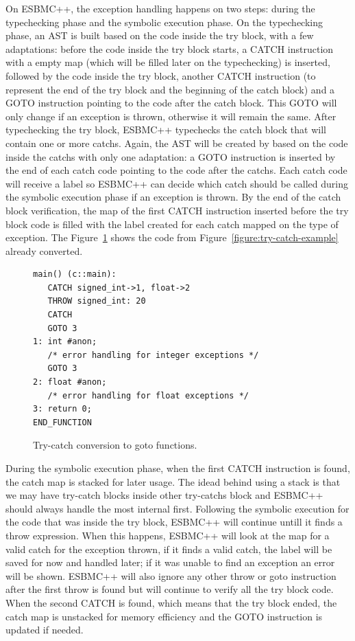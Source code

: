 \documentclass[a4paper]{llncs}
\begin{document}
On ESBMC++, the exception handling happens on two steps:
during the typechecking phase and the symbolic execution phase.
On the typechecking phase, an AST is built based on the code
inside the try block, with a few adaptations: before the code
inside the try block starts, a CATCH instruction with a empty map
(which will be filled later on the typechecking) is inserted, followed by
the code inside the try block, another CATCH instruction
(to represent the end of the try block and the beginning of the
catch block) and a GOTO instruction pointing to the code after
the catch block. This GOTO will only change if an exception is thrown,
otherwise it will remain the same. After typechecking the try block,
ESBMC++ typechecks the catch block that will contain one or more catchs.
Again, the AST will be created by based on the code inside the catchs
with only one adaptation: a GOTO instruction is inserted by the end of
each catch code pointing to the code after the catchs. Each catch code
will receive a label so ESBMC++ can decide which catch should be called
during the symbolic execution phase if an exception is thrown. By the end
of the catch block verification, the map of the first CATCH instruction
inserted before the try block code is filled with the label created
for each catch mapped on the type of exception. The Figure~\ref{figure:try-catch-goto}
shows the code from Figure~\ref{figure:try-catch-example} already converted.

\begin{figure}[ht]
\centering
\begin{minipage}{1.0\textwidth}
\begin{lstlisting}
main() (c::main):
   CATCH signed_int->1, float->2
   THROW signed_int: 20
   CATCH
   GOTO 3
1: int #anon;
   /* error handling for integer exceptions */
   GOTO 3
2: float #anon;
   /* error handling for float exceptions */
3: return 0;
END_FUNCTION
\end{lstlisting}
\end{minipage}
\caption{Try-catch conversion to goto functions.}
\label{figure:try-catch-goto}
\end{figure}

During the symbolic execution phase, when the first
CATCH instruction is found, the catch map is stacked
for later usage. The idead behind using a stack is
that we may have try-catch blocks inside other
try-catchs block and ESBMC++ should always handle
the most internal first. Following the symbolic execution
for the code that was inside the try block, ESBMC++ will continue
untill it finds a throw expression. When this happens, ESBMC++ will
look at the map for a valid catch for the exception thrown, if it finds
a valid catch, the label will be saved for now and handled later;
if it was unable to find an exception an error will be shown.
ESBMC++ will also ignore any other throw or goto instruction after
the first throw is found but will continue to verify all the try
block code. When the second CATCH is found, which means that the try
block ended, the catch map is unstacked for memory efficiency
and the GOTO instruction is updated if needed.
\end{document}
